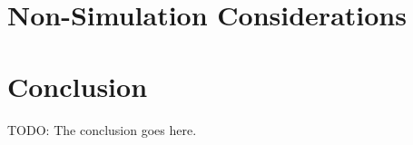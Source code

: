 \documentclass[conference]{IEEEtran}
\begin{document}
%






\section{Non-Simulation Considerations}



\section{Conclusion}
TODO: The conclusion goes here.




\end{document}
